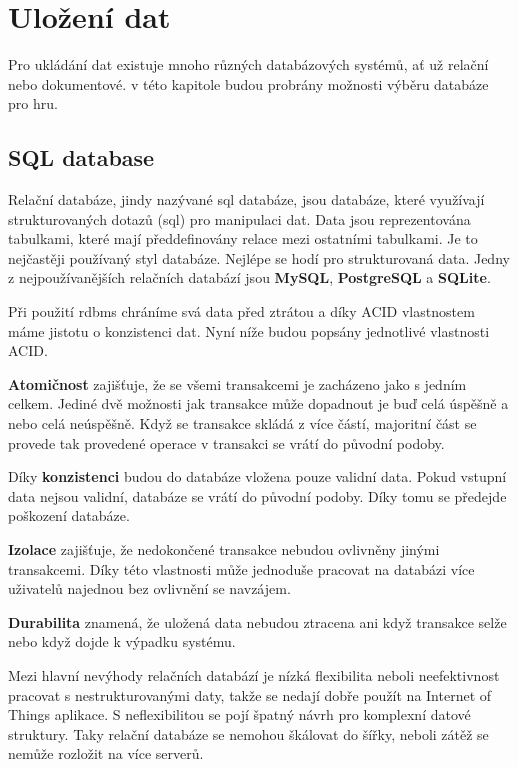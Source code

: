 \section{Uložení dat}\label{sec:data_storage}
Pro ukládání dat existuje mnoho různých databázových systémů, ať už relační nebo dokumentové. v této kapitole budou probrány možnosti výběru databáze pro hru.

\subsection{SQL database}\label{sec:data_storage:relational_db}
Relační databáze, jindy nazývané \gls{sql} databáze, jsou databáze, které využívají strukturovaných dotazů (\gls{sql}) pro manipulaci dat. Data jsou reprezentována tabulkami, které mají předdefinovány relace mezi ostatními tabulkami. Je to nejčastěji používaný styl databáze. Nejlépe se hodí pro strukturovaná data. Jedny z nejpoužívanějších relačních databází jsou \textbf{MySQL}, \textbf{PostgreSQL} a \textbf{SQLite}.

Při použití \gls{rdbms} chráníme svá data před ztrátou a díky ACID vlastnostem máme jistotu o konzistenci dat. Nyní níže budou popsány jednotlivé vlastnosti ACID.\label{sec:data_storage:relational_db:ACID}

\textbf{Atomičnost} zajišťuje, že se všemi transakcemi je zacházeno jako s jedním celkem. Jediné dvě možnosti jak transakce může dopadnout je buď celá úspěšně a nebo celá neúspěšně. Když se transakce skládá z více částí, majoritní část se provede tak provedené operace v transakci se vrátí do původní podoby.

Díky \textbf{konzistenci} budou do databáze vložena pouze validní data. Pokud vstupní data nejsou validní, databáze se vrátí do původní podoby. Díky tomu se předejde poškození databáze.

\textbf{Izolace}  zajišťuje, že nedokončené transakce nebudou ovlivněny jinými transakcemi. Díky této vlastnosti může jednoduše pracovat na databázi více uživatelů najednou bez ovlivnění se navzájem.

\textbf{Durabilita} znamená, že uložená data nebudou ztracena ani když transakce selže nebo když dojde k výpadku systému.

Mezi hlavní nevýhody relačních databází je nízká flexibilita neboli neefektivnost pracovat s nestrukturovanými daty, takže se nedají dobře použít na Internet of Things aplikace. S neflexibilitou se pojí špatný návrh pro komplexní datové struktury. Taky relační databáze se nemohou škálovat do šířky, neboli zátěž se nemůže rozložit na více serverů.

